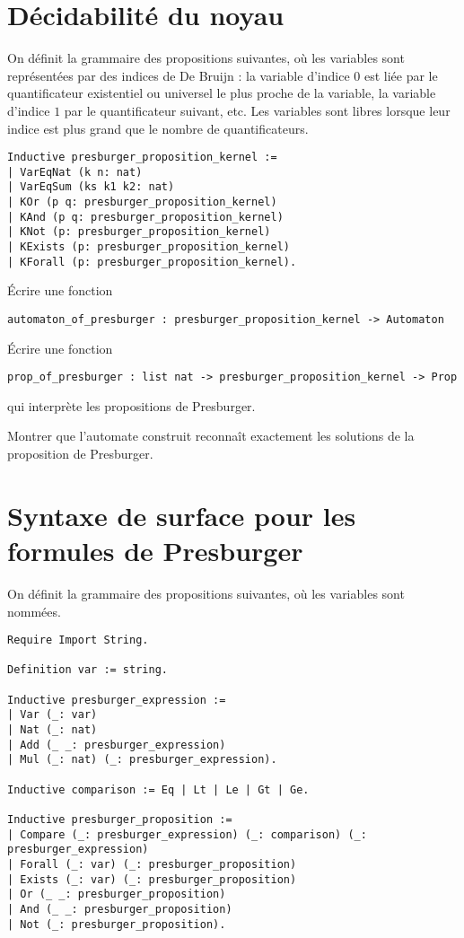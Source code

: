 \documentclass{article}
\begin{document}
\section{Décidabilité du noyau}

On définit la grammaire des propositions suivantes, où les variables sont représentées par des indices de De Bruijn :
la variable d'indice \(0\) est liée par le quantificateur existentiel ou universel le plus proche de la variable,
la variable d'indice \(1\) par le quantificateur suivant, etc. Les variables sont libres lorsque leur indice est plus grand que le nombre de quantificateurs.

\begin{verbatim}
Inductive presburger_proposition_kernel :=
| VarEqNat (k n: nat)
| VarEqSum (ks k1 k2: nat)
| KOr (p q: presburger_proposition_kernel)
| KAnd (p q: presburger_proposition_kernel)
| KNot (p: presburger_proposition_kernel)
| KExists (p: presburger_proposition_kernel)
| KForall (p: presburger_proposition_kernel).
\end{verbatim}

Écrire une fonction
\begin{verbatim}
automaton_of_presburger : presburger_proposition_kernel -> Automaton
\end{verbatim}

Écrire une fonction
\begin{verbatim}
prop_of_presburger : list nat -> presburger_proposition_kernel -> Prop
\end{verbatim}
qui interprète les propositions de Presburger.

Montrer que l'automate construit reconnaît exactement les solutions de la proposition de Presburger.

\section{Syntaxe de surface pour les formules de Presburger}

On définit la grammaire des propositions suivantes, où les variables sont nommées.

\begin{verbatim}
Require Import String.

Definition var := string.

Inductive presburger_expression :=
| Var (_: var)
| Nat (_: nat)
| Add (_ _: presburger_expression)
| Mul (_: nat) (_: presburger_expression).

Inductive comparison := Eq | Lt | Le | Gt | Ge.

Inductive presburger_proposition :=
| Compare (_: presburger_expression) (_: comparison) (_: presburger_expression)
| Forall (_: var) (_: presburger_proposition)
| Exists (_: var) (_: presburger_proposition)
| Or (_ _: presburger_proposition)
| And (_ _: presburger_proposition)
| Not (_: presburger_proposition).
\end{verbatim}
\end{document}
